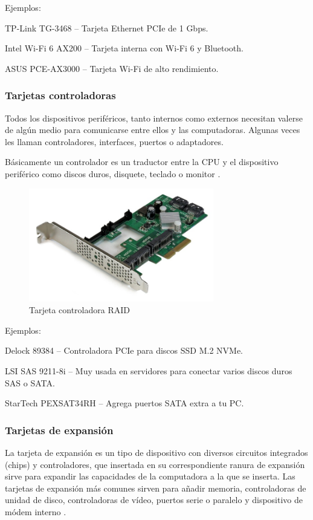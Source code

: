 Ejemplos:

TP-Link TG-3468 – Tarjeta Ethernet PCIe de 1 Gbps.

Intel Wi-Fi 6 AX200 – Tarjeta interna con Wi-Fi 6 y Bluetooth.

ASUS PCE-AX3000 – Tarjeta Wi-Fi de alto rendimiento.

\subsubsection{Tarjetas controladoras}

Todos los dispositivos periféricos, tanto internos como externos necesitan valerse de algún medio para comunicarse entre ellos y las computadoras. Algunas veces les llaman controladores, interfaces, puertos o adaptadores.

Básicamente un controlador es un traductor entre la CPU y el dispositivo periférico como discos duros, disquete, teclado o monitor \cite{tarjcontrol}.

\begin{figure}
  \centering
  \includegraphics[scale=0.9]{imagenes/tarjeta-controladora.png}
  \caption{Tarjeta controladora RAID}
\end{figure}

Ejemplos:


Delock 89384 – Controladora PCIe para discos SSD M.2 NVMe.

LSI SAS 9211-8i – Muy usada en servidores para conectar varios discos duros SAS o SATA.

StarTech PEXSAT34RH – Agrega puertos SATA extra a tu PC.

\subsubsection{Tarjetas de expansión}

La tarjeta de expansión es un tipo de dispositivo con diversos circuitos integrados (chips) y controladores, que insertada en su correspondiente ranura de expansión sirve para expandir las capacidades de la computadora a la que se inserta. Las tarjetas de expansión más comunes sirven para añadir memoria, controladoras de unidad de disco, controladoras de vídeo, puertos serie o paralelo y dispositivo de módem interno \cite{wikitarjexpan}.

